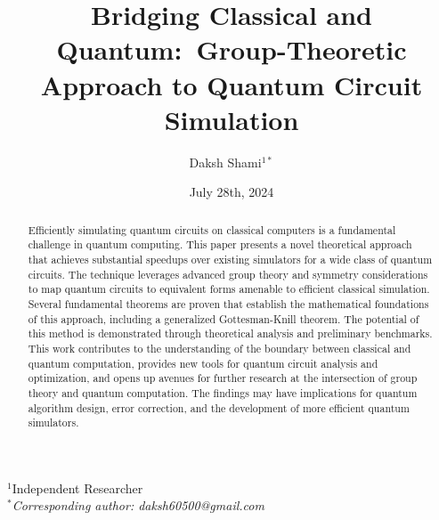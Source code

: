 \documentclass[11pt,a4paper]{article}
\title{Bridging Classical and Quantum:\ Group-Theoretic Approach to Quantum Circuit Simulation}
\author{Daksh Shami$^{1*}$}
\begin{document}
\date{July 28th, 2024}
\maketitle

$^1$Independent Researcher \\

\textit{$^*$Corresponding author: daksh60500@gmail.com}
\begin{abstract}
Efficiently simulating quantum circuits on classical computers is a fundamental challenge in quantum computing. This paper presents a novel theoretical approach that achieves substantial speedups over existing simulators for a wide class of quantum circuits. The technique leverages advanced group theory and symmetry considerations to map quantum circuits to equivalent forms amenable to efficient classical simulation. Several fundamental theorems are proven that establish the mathematical foundations of this approach, including a generalized Gottesman-Knill theorem. The potential of this method is demonstrated through theoretical analysis and preliminary benchmarks. This work contributes to the understanding of the boundary between classical and quantum computation, provides new tools for quantum circuit analysis and optimization, and opens up avenues for further research at the intersection of group theory and quantum computation. The findings may have implications for quantum algorithm design, error correction, and the development of more efficient quantum simulators.
\end{abstract}
\end{document}
